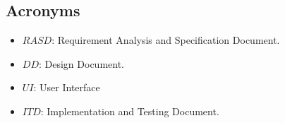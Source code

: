 \subsection{Acronyms}

\begin{itemize}
	\item $RASD$: Requirement Analysis and Specification Document.
	\item $DD$: Design Document.
	\item $UI$: User Interface
	\item $ ITD$: Implementation and Testing Document.

\end{itemize}
 